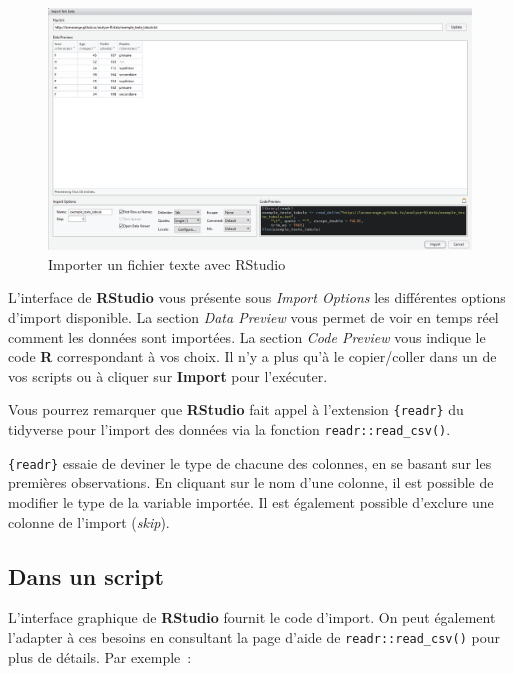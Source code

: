 \documentclass[
  letterpaper,
  DIV=11,
  numbers=noendperiod,
  oneside]{scrreprt}
\begin{document}
\begin{figure}

{\centering \includegraphics{manipulation/ressources/capture_RStudio_import_readr.png}

}

\caption{\label{fig-import-rstudio-readr}Importer un fichier texte avec
RStudio}

\end{figure}

L'interface de \textbf{RStudio} vous présente sous \emph{Import Options}
les différentes options d'import disponible. La section \emph{Data
Preview} vous permet de voir en temps réel comment les données sont
importées. La section \emph{Code Preview} vous indique le code
\textbf{R} correspondant à vos choix. Il n'y a plus qu'à le
copier/coller dans un de vos scripts ou à cliquer sur \textbf{Import}
pour l'exécuter.

Vous pourrez remarquer que \textbf{RStudio} fait appel à l'extension
\texttt{\{readr\}} du tidyverse pour l'import des données via la
fonction \texttt{readr::read\_csv()}.

\texttt{\{readr\}} essaie de deviner le type de chacune des colonnes, en
se basant sur les premières observations. En cliquant sur le nom d'une
colonne, il est possible de modifier le type de la variable importée. Il
est également possible d'exclure une colonne de l'import (\emph{skip}).

\hypertarget{dans-un-script}{%
\subsection{Dans un script}\label{dans-un-script}}

L'interface graphique de \textbf{RStudio} fournit le code d'import. On
peut également l'adapter à ces besoins en consultant la page d'aide de
\texttt{readr::read\_csv()} pour plus de détails. Par exemple~:
\end{document}
